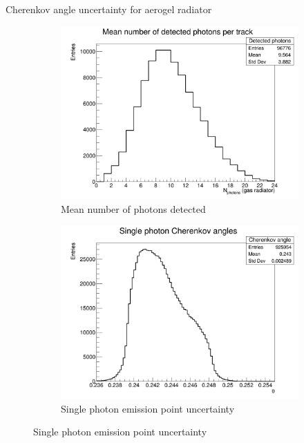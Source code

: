 \documentclass{beamer}
\begin{document}
\begin{frame}{Cherenkov angle uncertainty for aerogel radiator}
  \begin{figure}
    \centering
    \vspace{-0.2cm}
    \begin{subfigure}{0.35\textwidth}
      \includegraphics[width = 1.0\textwidth]{Plots/NumberDetectedPhotons_Barrel_Aerogel.png}
      \caption{Mean number of photons detected}
    \end{subfigure}
    \begin{subfigure}{0.35\textwidth}
      \includegraphics[width = 1.0\textwidth]{Plots/SinglePhotonCherenkovAngles_Barrel_Aerogel.png}
      \caption{Single photon emission point uncertainty}
    \end{subfigure}%

\end{figure}
\end{frame}
\end{document}
